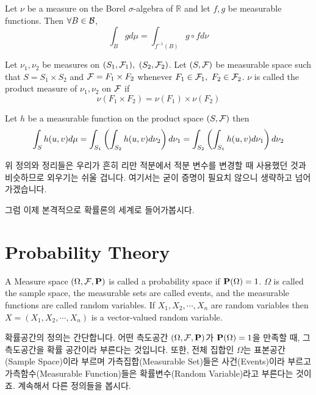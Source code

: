 \documentclass[final]{IEEEphot}
\begin{document}
\begin{theorem}
	Let $\nu$ be a measure on the Borel $\sigma$-algebra of $\mathbb{R}$ and let $f,g$ be measurable functions. Then $\forall B \in \B$,
	$$\int_B g d\mu = \int_{f^{-1}(B)} g \circ f d\nu$$
	
	\HL
\end{theorem}

\newpage

\begin{definition}
	Let $\nu_1,\nu_2$ be measures on $(S_1, \F_1),~(S_2, \F_2)$. Let $(S,\F)$ be measurable space such that $S = S_1\times S_2$ and $\F = F_1\times F_2$ whenever $F_1\in \F_1, ~ F_2\in \F_2$.
	$\nu$ is called the product measure of $\nu_1, \nu_2$ on $\F$ if 
	$$\nu(F_1 \times F_2) = \nu(F_1)\times \nu(F_2)$$
	
	\HL
\end{definition}

\begin{theorem}
	Let $h$ be a measurable function on the product space $(S,\F)$ then
	$$\int_S h(u,v) d\mu = \int_{S_1}\Sbk{\int_{S_2} h(u,v) d\nu_2}d\nu_1 = \int_{S_2}\Sbk{\int_{S_1} h(u,v) d\nu_1}d\nu_2 $$
	
	\HL
\end{theorem}

위 정의와 정리들은 우리가 흔히 리만 적분에서 적분 변수를 변경할 때 사용했던 것과 비슷하므로 외우기는 쉬울 겁니다. 여기서는 굳이 증명이 필요치 않으니 생략하고 넘어가겠습니다.

\VS

\HS 그럼 이제 본격적으로 확률론의 세계로 들어가봅시다.

\newpage

\section{Probability Theory}

\begin{definition}
	A Measure space $(\Omega, \F, \P)$ is called a probability space if $\P(\Omega) = 1$. $\Omega$ is called the sample space, the measurable sets are called events, and the measurable functions are called random variables. If $X_1,X_2,\cdots,X_n$ are random variables then $X = (X_1, X_2,\cdots,X_n)$ is a vector-valued random variable.
	
	\HL
\end{definition}

\HS 확률공간의 정의는 간단합니다. 어떤 측도공간 $(\Omega, \F, \P)$가 $\P(\Omega) = 1$을 만족할 때, 그 측도공간을 확률 공간이라 부른다는 것입니다. 또한, 전체 집합인 $\Omega$는 표본공간(Sample Space)이라 부르며 가측집합(Measurable Set)들은 사건(Events)이라 부르고 가측함수(Measurable Function)들은 확률변수(Random Variable)라고 부른다는 것이죠. 계속해서 다른 정의들을 봅시다.
\end{document}
